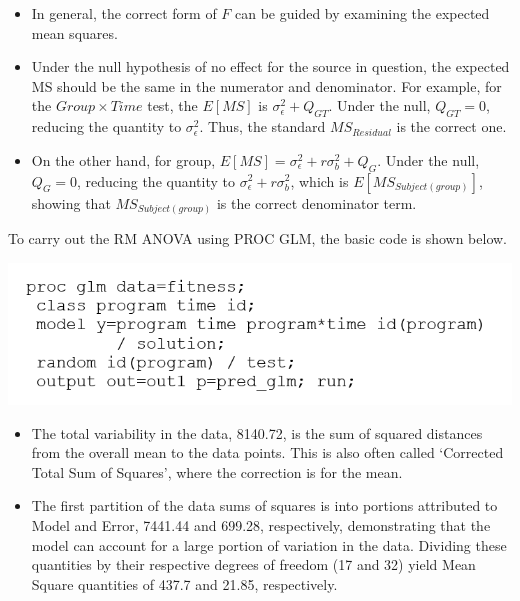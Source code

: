 \documentclass[
  9pt,
  ignorenonframetext,
]{beamer}
\begin{document}
\begin{frame}{}
\protect\hypertarget{section-3}{}
\begin{itemize}
\item
  In general, the correct form of \(F\) can be guided by examining the
  expected mean squares.
\item
  Under the null hypothesis of no effect for the source in question, the
  expected MS should be the same in the numerator and denominator. For
  example, for the \(Group \times Time\) test, the \(E[MS]\) is
  \(\sigma _\epsilon^2+Q_{GT}\). Under the null, \(Q_{GT}=0\), reducing
  the quantity to \(\sigma _\epsilon^2\). Thus, the standard
  \(MS_{Residual}\) is the correct one.
\item
  On the other hand, for group,
  \(E[MS]= \sigma _\epsilon^2+r\sigma _b^2+Q_G\). Under the null,
  \(Q_G=0\), reducing the quantity to
  \(\sigma _\epsilon^2+r\sigma _b^2\), which is
  \(E[MS_{Subject(group)}]\), showing that \(MS_{Subject(group)}\) is
  the correct denominator term.
\end{itemize}
\end{frame}

\begin{frame}{}
\protect\hypertarget{section-4}{}
To carry out the RM ANOVA using PROC GLM, the basic code is shown below.

\includegraphics[width=1\linewidth]{figs_L4/f2}

\begin{itemize}
\item
  The total variability in the data, 8140.72, is the sum of squared
  distances from the overall mean to the data points. This is also often
  called `Corrected Total Sum of Squares', where the correction is for
  the mean.
\item
  The first partition of the data sums of squares is into portions
  attributed to Model and Error, 7441.44 and 699.28, respectively,
  demonstrating that the model can account for a large portion of
  variation in the data. Dividing these quantities by their respective
  degrees of freedom (17 and 32) yield Mean Square quantities of 437.7
  and 21.85, respectively.
\end{itemize}
\end{frame}
\end{document}
